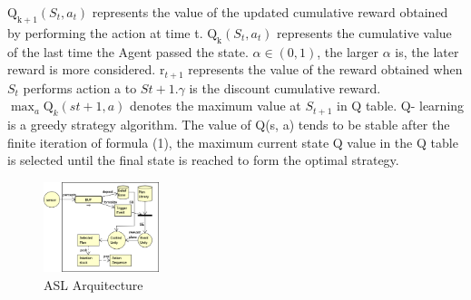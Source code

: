 \documentclass{article}
\begin{document}
\begin{multicols}{2}
$\mathrm{Q}_{\mathrm{k}+1}\left(S_t, a_t\right)$ represents the value of the updated cumulative reward
obtained by performing the action at time t. $\mathrm{Q}_{\mathrm{k}}\left(S_t, a_t\right)$
represents
the cumulative value of the last time the Agent passed the state.
$\alpha \in(0,1)$, the larger $\alpha$ is, the later reward is more considered. $\mathrm{r}_{t+1}$ represents the value of the reward obtained when $S_t$ performs action a to $S t+1 . \gamma$ is the discount cumulative reward. $\max _a \mathrm{Q}_k(s t+1, a)$ denotes the maximum value at $S_{t+1}$ in Q table. Q-  learning is a greedy strategy algorithm. The value of Q(s, a) tends
to be stable after the finite iteration of formula (1), the maximum
current state Q value in the Q table is selected until the final state
is reached to form the optimal strategy.

\begin{figure}[h]
\centering
\includegraphics[width=0.3\textwidth]{fig1.png}
\caption{ASL Arquitecture}
\label{figura1}
\end{figure}



\end{multicols}
\end{document}
